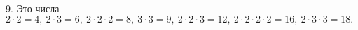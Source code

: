 9. Это числа $2\cdot2=4,\ 2\cdot3=6,\ 2\cdot2\cdot2=8,\ 3\cdot3=9,\ 2\cdot2\cdot3=12,\ 2\cdot2\cdot2\cdot2=16,\ 2\cdot3\cdot3=18.$\\
